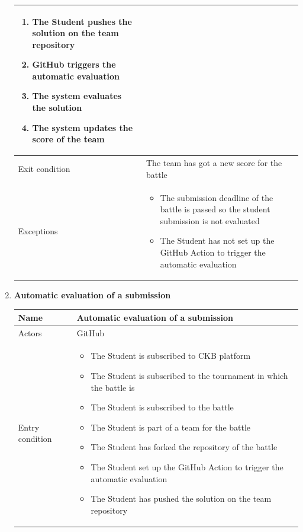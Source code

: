 \begin{enumerate}[label=UC\arabic*:]
\begin{tabular}{|p{3cm}|p{8cm}|}
\begin{enumerate}[label=\arabic*.]
            \item The Student pushes the solution on the team repository
            \item GitHub triggers the automatic evaluation
            \item The system evaluates the solution
            \item The system updates the score of the team
        \end{enumerate} \\
        \hline
        Exit condition & The team has got a new score for the battle \\
        \hline
        Exceptions &
        \begin{itemize}
            \item The submission deadline of the battle is passed so the student submission is not evaluated
            \item The Student has not set up the GitHub Action to trigger the automatic evaluation
        \end{itemize} \\
        \hline
    \end{tabular}
    \item \textbf{Automatic evaluation of a submission} \\
    \begin{tabular}{|p{3cm}|p{8cm}|}
        \hline
        Name & Automatic evaluation of a submission \\
        \hline
        Actors & GitHub \\
        \hline
        Entry condition &
        \begin{itemize}
            \item The Student is subscribed to CKB platform
            \item The Student is subscribed to the tournament in which the battle is
            \item The Student is subscribed to the battle
            \item The Student is part of a team for the battle
            \item The Student has forked the repository of the battle
            \item The Student set up the GitHub Action to trigger the automatic evaluation
            \item The Student has pushed the solution on the team repository
        \end{itemize} \\

\end{tabular}
\end{enumerate}
